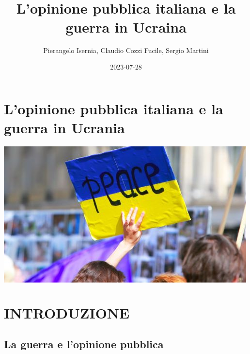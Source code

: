 \documentclass[
]{book}
\title{L'opinione pubblica italiana e la guerra in Ucraina}
\author{Pierangelo Isernia, Claudio Cozzi Fucile, Sergio Martini}
\date{2023-07-28}
\begin{document}
\maketitle

{
\setcounter{tocdepth}{1}
\tableofcontents
}
\hypertarget{lopinione-pubblica-italiana-e-la-guerra-in-ucrania}{%
\chapter*{L'opinione pubblica italiana e la guerra in Ucrania}\label{lopinione-pubblica-italiana-e-la-guerra-in-ucrania}}

\includegraphics{Images/Ucrania.jpeg}

\hypertarget{introduzione}{%
\chapter{INTRODUZIONE}\label{introduzione}}

\hypertarget{la-guerra-e-lopinione-pubblica}{%
\section{La guerra e l'opinione pubblica}\label{la-guerra-e-lopinione-pubblica}}
\end{document}
